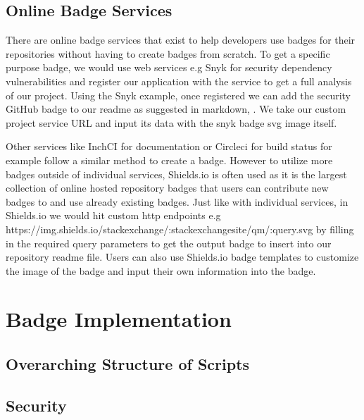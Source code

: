 \documentclass[12pt, letterpaper]{article}
\begin{document}
\subsection{Online Badge Services}
There are online badge services that exist to help developers use badges for their
repositories without having to create badges from scratch. To get a specific purpose badge,
we would use web services e.g Snyk for security dependency vulnerabilities \cite{snyk} and register
our application with the service to get a full analysis of our project. 
Using the Snyk example, once registered we can add the security GitHub badge to our readme as
suggested in markdown, 
\cite{snyk}. 
We take our custom project service URL and input its data with the snyk badge svg image itself.


Other services like InchCI for documentation \cite{inchci} or Circleci for build status \cite{circleci} for example
follow a similar method to create a badge. 
However to utilize more badges outside of individual services, Shields.io \cite{shields} is often used
as it is the largest collection
of online hosted repository badges that users can contribute new badges to and use already
existing badges. Just like with individual services, in Shields.io \cite{shields} we would hit custom
http endpoints e.g https://img.shields.io/stackexchange/:stackexchangesite/qm/:query.svg \cite{shields} 
by filling in the 
required query parameters to get the output badge to insert into our repository readme file. 
Users can also use Shields.io \cite{shields} badge templates to customize the image of the badge and 
input their own information into the badge.


\section{Badge Implementation}
\subsection{Overarching Structure of Scripts}

\subsection{Security}
\end{document}
